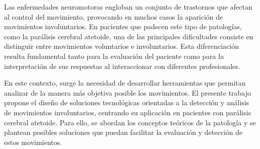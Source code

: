 

Las enfermedades neuromotoras engloban un conjunto de trastornos que afectan al control del movimiento, provocando en muchos casos la aparición de movimientos involuntarios. En pacientes que padecen este tipo de patologías, como la parálisis cerebral atetoide, una de las principales dificultades consiste en distinguir entre movimientos voluntarios e involuntarios. Esta diferenciación resulta fundamental tanto para la evaluación del paciente como para la interpretación de sus respuestas al interaccionar con diferentes profesionales. 

En este contexto, surge la necesidad de desarrollar herramientas que permitan analizar de la manera más objetiva posible los movimientos. El presente trabajo propone el diseño de soluciones tecnológicas orientadas a la detección y análisis de movimientos involuntarios, centrando su aplicación en pacientes con parálisis cerebral atetoide. Para ello, se abordan los conceptos teóricos de la patología y se plantean posibles soluciones que puedan facilitar la evaluación y detección de estos movimientos. 






